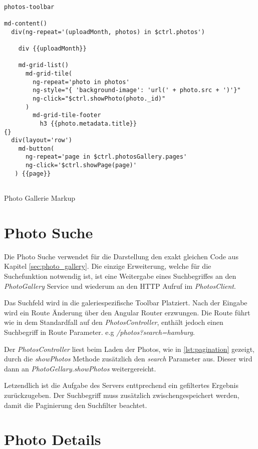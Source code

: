 \begin{listing}[H]
\begin{verbatim}

photos-toolbar

md-content()
  div(ng-repeat='(uploadMonth, photos) in $ctrl.photos')

    div {{uploadMonth}}

    md-grid-list()
      md-grid-tile(
        ng-repeat='photo in photos'
        ng-style="{ 'background-image': 'url(' + photo.src + ')'}"
        ng-click="$ctrl.showPhoto(photo._id)"
      )
        md-grid-tile-footer
          h3 {{photo.metadata.title}}
{}
  div(layout='row')
    md-button(
      ng-repeat='page in $ctrl.photosGallery.pages'
      ng-click='$ctrl.showPage(page)'
   ) {{page}}


\end{verbatim}
\caption{Photo Gallerie Markup}
\label{lst:photo_group_jade}
\end{listing} 

\section{Photo Suche}

Die Photo Suche verwendet für die Darstellung den exakt gleichen Code aus Kapitel \ref{sec:photo_gallery}. Die einzige Erweiterung, welche für die Suchefunktion notwendig ist, ist eine Weitergabe eines Suchbegriffes an den \textit{PhotoGallery} Service und wiederum an den HTTP Aufruf im \textit{PhotosClient}.

Das Suchfeld wird in die galeriespezifische Toolbar Platziert. Nach der Eingabe wird ein Route Änderung über den Angular Router erzwungen. Die Route führt wie in dem Standardfall auf den \textit{PhotosController}, enthält jedoch einen Suchbegriff in Route Parameter. e.g \textit{/photos?search=hamburg}. 

Der \textit{PhotosController} liest beim Laden der Photos, wie in \ref{lst:pagination} gezeigt, durch die \textit{showPhotos} Methode zusätzlich den  
\textit{search} Parameter aus. Dieser wird dann an \textit{PhotoGellary.showPhotos} weitergereicht. 

Letzendlich ist die Aufgabe des Servers enttprechend ein gefiltertes Ergebnis zurückzugeben. Der Suchbegriff muss zusätzlich zwischengespeichert werden, damit die Paginierung den Suchfilter beachtet.

\section{Photo Details}
\label{sec:photo_details}


